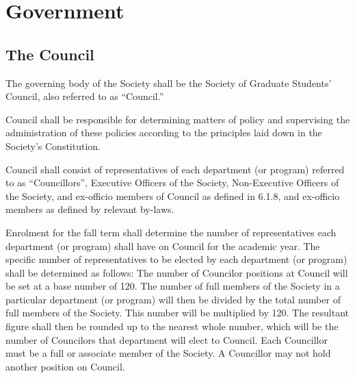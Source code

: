 \newpage

\section{Government}
\subsection{The Council}
	\begin{longenum}[label*=\thesubsection.\arabic*., align=left]
	\item The governing body of the Society shall be the Society of Graduate Students' Council, also referred to as ``Council.''
	
	\item Council shall be responsible for determining matters of policy and supervising the administration of these policies according to the principles laid down in the Society's Constitution. 
    
    \item Council shall consist of representatives of each department (or program) referred to as ``Councillors'', Executive Officers of the
Society, Non-Executive Officers of the Society, and ex-officio members of Council as defined in 6.1.8, and ex-officio members as
defined by relevant by-laws.   
\item Enrolment for the fall term shall determine the number of representatives each department (or program) shall have on Council for the academic year. The specific number of representatives to be elected by each department (or program) shall be determined as follows: The number of Councilor positions at Council will be set at a base number of 120. The number of full members of the Society in a particular department (or program) will then be divided by the total number of full members of the Society. This number will be multiplied by 120. The resultant figure shall then be rounded up to the nearest whole number, which will be the number of Councilors that department will elect to Council. Each Councillor must be a full or associate member of the Society. A Councillor may not hold another position on Council. 
    

\end{longenum}
